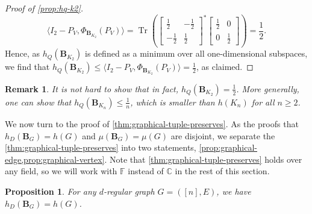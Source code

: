 \documentclass[11pt]{article}
\newtheorem{proposition}[theorem]{Proposition}
\newtheorem{remark}[theorem]{Remark}
\theoremstyle{plain}
\numberwithin{equation}{section}
\theoremstyle{definition}
\DeclareMathOperator{\trace}{Tr}
\newcommand{\tuple}[1]{\mathbf{#1}}
\newcommand{\vB}{\tuple{B}}
\begin{document}
\begin{proof}[Proof of \cref{prop:hq-k2}]
    \[
        \langle I_2-P_V, \Phi_{\vB_{K_2}}(P_V)\rangle = \trace \left(
        \begin{bmatrix}
            \frac 12 & -\frac 12 \\ -\frac 12&\frac 12
        \end{bmatrix}^*
        \begin{bmatrix}
            \frac 12 &0\\0&\frac 12
        \end{bmatrix}
        \right)
        =\frac 12.
    \]
    Hence, as $h_Q(\vB_{K_2})$ is defined as a minimum over all one-dimensional subspaces, we find that $h_Q(\vB_{K_2}) \leq \langle I_2-P_V, \Phi_{\vB_{K_2}}(P_V)\rangle = \frac 12$, as claimed.
\end{proof}

\begin{remark}
It is not hard to show that in fact, $h_Q(\vB_{K_2})=\frac 12$. More generally, one can show that $h_Q(\vB_{K_n})\leq\frac 1n$, which is smaller than $h(K_n)$ for all $n\geq2$. 
\end{remark}
We now turn to the proof of \cref{thm:graphical-tuple-preserves}. As the proofs that $h_D(\vB_G)=h(G)$ and $\mu(\vB_G)=\mu(G)$ are disjoint, we separate the \cref{thm:graphical-tuple-preserves} into two statements, \cref{prop:graphical-edge,prop:graphical-vertex}.
Note that \cref{thm:graphical-tuple-preserves} holds over any field, so we will work with $\mathbb{F}$ instead of $\mathbb{C}$ in the rest of this section. 
\begin{proposition}\label{prop:graphical-edge}
    For any $d$-regular graph $G=([n],E)$, we have $h_D(\vB_G)=h(G)$.
\end{proposition}
\end{document}
